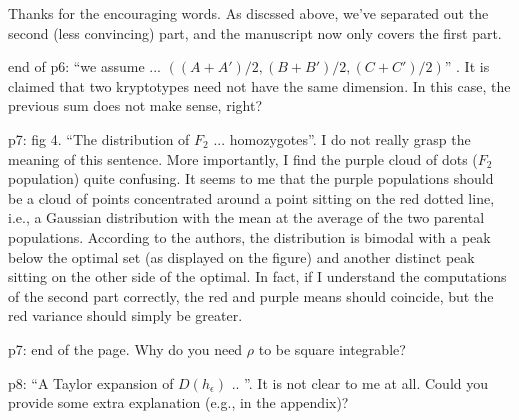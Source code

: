Thanks for the encouraging words.
As discssed above, we've separated out the second (less convincing) part,
and the manuscript now only covers the first part.

\begin{point}{end of p6:} 
    ``we assume ... $((A + A' )/2, (B + B' )/2, (C + C' )/2)$'' . It is claimed 
    that two kryptotypes need not have the same dimension. In this
    case, the previous sum does not make sense, right?
\end{point}


\begin{point}{p7: fig 4.}
    ``The distribution of $F_2$ ... homozygotes''. I do not really grasp the meaning of this
sentence. More importantly, I find the purple cloud of dots ($F_2$ population) quite confusing.
It seems to me that the purple populations should be a cloud of points concentrated around
a point sitting on the red dotted line, i.e., a Gaussian distribution with the mean at the
average of the two parental populations. According to the authors, the distribution is
bimodal with a peak below the optimal set (as displayed on the figure) and another distinct
peak sitting on the other side of the optimal. In fact, if I understand the computations of
the second part correctly, the red and purple means should coincide, but the red variance
should simply be greater.
\end{point}


\begin{point}{p7: end of the page.}
    Why do you need $\rho$ to be square integrable?
\end{point}


\begin{point}{p8:}
    ``A Taylor expansion of $D(h_\epsilon)$ .. ''. It is not clear to me at all. Could you provide some
extra explanation (e.g., in the appendix)?
\end{point}

